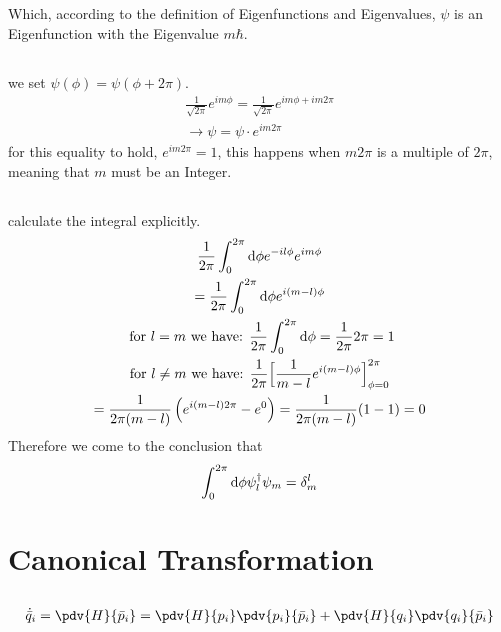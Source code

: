 \documentclass[]{scrartcl}
\begin{document}
Which, according to the definition of Eigenfunctions and Eigenvalues, $\psi$ is an Eigenfunction with the Eigenvalue $m\hbar$.

\subsection{}

we set $\psi(\phi) = \psi(\phi + 2\pi)$.
\begin{gather}
	\frac{1}{\sqrt{2\pi}}e^{im\phi} = \frac{1}{\sqrt{2\pi}}e^{im\phi + im2\pi}\\
	\rightarrow \psi = \psi\cdot e^{im2\pi}
\end{gather}
for this equality to hold, $e^{im2\pi} = 1$, this happens when $m2\pi$ is a multiple of $2\pi$, meaning that $m$ must be an Integer.

\subsection{}

calculate the integral explicitly.
\begin{gather}
	\frac{1}{2\pi}\int_0^{2\pi} \text d \phi e^{-il \phi}e^{im\phi}\\
	= \frac{1}{2\pi}\int_0^{2\pi}\text d \phi e^{i(m-l)\phi}\\
	\text{ for $l = m$ we have: }\frac{1}{2\pi}\int_0^{2\pi}\text d\phi = \frac{1}{2\pi}2\pi = 1\\
	\text{for $l \neq m$ we have: }\frac{1}{2\pi}\Bigr[\frac{1}{m-l}e^{i(m-l)\phi}\Bigl]_{\phi=0}^{2\pi}\\
	= \frac{1}{2\pi(m-l)}\left(e^{i(m-l)2\pi} - e^0\right) = \frac{1}{2\pi(m-l)}(1-1) = 0
\end{gather}
Therefore we come to the conclusion that
$$
\int_0^{2\pi}\text d\phi \psi_l^\dagger \psi_m = \delta^l_m
$$

\section{Canonical Transformation}

\subsection{}

\begin{gather}
	\dot{\bar{q}}_i = \pdv{H}{\bar p_i} = \pdv{H}{p_i}\pdv{p_i}{\bar p_i} + \pdv{H}{q_i}\pdv{q_i}{\bar p_i}
\end{gather}
\end{document}
